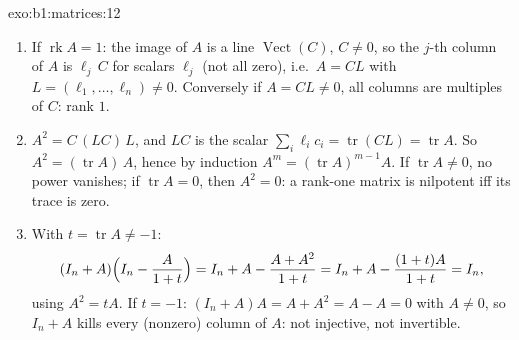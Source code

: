 \begin{solution}{exo:b1:matrices:12}
\begin{enumerate}
  \item If $\operatorname{rk} A = 1$: the image of $A$ is a line
        $\operatorname{Vect}(C)$, $C \neq 0$, so the $j$-th
        column of $A$ is $\ell_j\,C$ for scalars $\ell_j$ (not
        all zero), i.e.\ $A = C L$ with $L = (\ell_1, \dots,
        \ell_n) \neq 0$. Conversely if $A = CL \neq 0$, all
        columns are multiples of $C$: rank $1$.
  \item $A^2 = C\,(L C)\,L$, and $LC$ is the scalar $\sum_i
        \ell_i c_i = \operatorname{tr}(CL) = \operatorname{tr}
        A$. So $A^2 = (\operatorname{tr} A)\,A$, hence by
        induction $A^m = (\operatorname{tr} A)^{m-1} A$. If
        $\operatorname{tr} A \neq 0$, no power vanishes; if
        $\operatorname{tr} A = 0$, then $A^2 = 0$: a rank-one
        matrix is nilpotent iff its trace is zero.
  \item With $t = \operatorname{tr} A \neq -1$:
        \[
        (I_n + A)\Bigl(I_n - \frac{A}{1 + t}\Bigr)
        = I_n + A - \frac{A + A^2}{1 + t}
        = I_n + A - \frac{(1 + t)A}{1 + t} = I_n ,
        \]
        using $A^2 = tA$. If $t = -1$: $(I_n + A)A = A + A^2 = A
        - A = 0$ with $A \neq 0$, so $I_n + A$ kills every
        (nonzero) column of $A$: not injective, not invertible.
\end{enumerate}
\end{solution}

